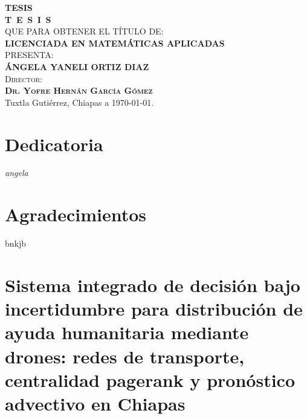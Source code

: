 \documentclass[
  spanish,
  us-letterpaper,
]{scrreprt}
\numberwithin{equation}{section}
\renewcommand*\contentsname{Tabla de contenidos}
\newcommand\contentsname{Tabla de contenidos}
\begin{document}
\begin{titlepage}
\begin{minipage}[t][0.95\textheight][c]{0.76\textwidth}
            \begin{center}
                {\Large\bfseries TESIS}\\[2cm]
                \textsc{\huge \textbf{T\, E\, S\, I\, S}}\\[1.5cm]
                \textsc{\large QUE PARA OBTENER EL TÍTULO DE:}\\[0.3cm]
                \textbf{\textsc{LICENCIADA EN MATEMÁTICAS APLICADAS}}\\[1.5cm]
                \textsc{\large PRESENTA:}\\[0.3cm]
                \textbf{\textsc{\large {ÁNGELA YANELI ORTIZ DIAZ}}}\\[2cm]
                {\large\scshape Director:\\[0.3cm]
                {\textbf{\large Dr. Yofre Hernán García Gómez }}}\\[2.0cm]
                \large{Tuxtla Gutiérrez, Chiapas a \today.}

            \end{center}
\end{minipage}
\end{titlepage}

\pagebreak[2]

\chapter*{Dedicatoria}
\begin{center}
\itshape
\setlength{\parindent}{0pt} %
\setlength{\parskip}{1.2\baselineskip} %
angela
\end{center}
\chapter*{Agradecimientos}
bnkjb

\renewcommand*\contentsname{Tabla de contenidos}
{
\hypersetup{linkcolor=}
\setcounter{tocdepth}{2}
\tableofcontents
}


\chapter{Sistema integrado de decisión bajo incertidumbre para
distribución de ayuda humanitaria mediante drones: redes de transporte,
centralidad pagerank y pronóstico advectivo en
Chiapas}\label{sistema-integrado-de-decisiuxf3n-bajo-incertidumbre-para-distribuciuxf3n-de-ayuda-humanitaria-mediante-drones-redes-de-transporte-centralidad-pagerank-y-pronuxf3stico-advectivo-en-chiapas}
\end{document}
